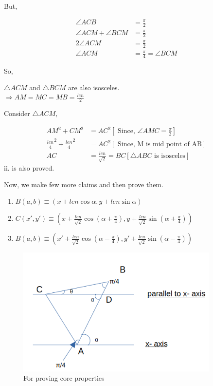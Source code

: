 \documentclass{article}
\begin{document}
But, 

\begin{align*}
    \angle ACB &= \frac{\pi}{2}\\
    \angle ACM + \angle BCM &= \frac{\pi}{2} \\
    2 \angle ACM &= \frac{\pi}{2} \\
    \angle ACM &= \frac{\pi}{4} = \angle BCM
\end{align*}

So, 


\( \triangle ACM \) and \( \triangle BCM \) are also isosceles.\\
\( \Rightarrow AM = MC = MB = \frac{len}{2} \)


Consider \(\triangle ACM ,\) 

\begin{align*}
   AM^2 + CM^2 &= AC^2 \left[ \text{ Since, } \angle AMC = \frac{\pi}{2} \right] \\
   \frac{len}{4}^2 + \frac{len}{4}^2 &= AC^2 \left[ \text{  Since, M is mid point of AB}\right]\\
   AC &= \frac{len}{\sqrt{2}} = BC \left[\triangle ABC \text{  is isosceles}\right]
\end{align*}
ii. is also proved.

Now, we make few more claims and then prove them.

\begin{enumerate}[label=\roman*.,start=3]
    \item \(B (a, b) \equiv (x+len \cos \alpha, y + len \sin \alpha)\)
    \item \(C (x', y') \equiv \left(x+\frac{len }{\sqrt{2}} \cos (\alpha + \frac{\pi}{4}), y + \frac{len}{\sqrt{2}} \sin (\alpha + \frac{\pi}{4})\right)\)
    \item \(B (a, b) \equiv \left(x' +\frac{len }{\sqrt{2}} \cos (\alpha - \frac{\pi}{4}), y' + \frac{len}{\sqrt{2}} \sin (\alpha - \frac{\pi}{4})\right)\)
\end{enumerate}

\begin{figure}[H]
    \centering
    \includegraphics[width=
    0.9\textwidth]{figures/fig2}
    \caption{For proving core properties}
\end{figure}
\end{document}
